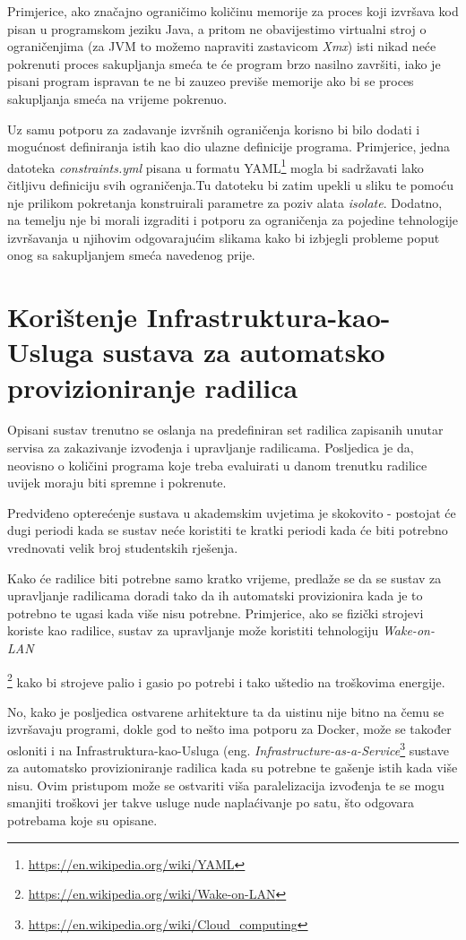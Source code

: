 \documentclass[times, utf8, zavrsni]{fer}
\begin{document}
{{Primjerice, ako značajno ograničimo količinu memorije za proces koji izvršava kod pisan u programskom jeziku Java, a pritom ne obavijestimo virtualni stroj o ograničenjima (za JVM to možemo napraviti zastavicom {\textit{Xmx}}) isti nikad neće pokrenuti proces sakupljanja smeća te će program brzo nasilno završiti, iako je pisani program ispravan te ne bi zauzeo previše memorije ako bi se proces sakupljanja smeća na vrijeme pokrenuo.

Uz samu potporu za zadavanje izvršnih ograničenja korisno bi bilo dodati i mogućnost definiranja istih kao dio ulazne definicije programa. Primjerice, jedna datoteka {\textit{constraints.yml}} pisana u formatu YAML\footnote{\url{https://en.wikipedia.org/wiki/YAML}} mogla bi sadržavati lako čitljivu definiciju svih ograničenja.Tu datoteku bi zatim upekli u sliku te pomoću nje prilikom pokretanja konstruirali parametre za poziv alata {\textit{isolate}}. Dodatno, na temelju nje bi morali izgraditi i potporu za ograničenja za pojedine tehnologije izvršavanja u njihovim odgovarajućim slikama kako bi izbjegli probleme poput onog sa sakupljanjem smeća navedenog prije.


\section{Korištenje Infrastruktura-kao-Usluga sustava za automatsko provizioniranje radilica}

Opisani sustav trenutno se oslanja na predefiniran set radilica zapisanih unutar servisa za zakazivanje izvođenja i upravljanje radilicama. Posljedica je da, neovisno o količini programa koje treba evaluirati u danom trenutku radilice uvijek moraju biti spremne i pokrenute.

Predviđeno opterećenje sustava u akademskim uvjetima je skokovito - postojat će dugi periodi kada se sustav neće koristiti te kratki periodi kada će biti potrebno vrednovati velik broj studentskih rješenja.

Kako će radilice biti potrebne samo kratko vrijeme, predlaže se da se sustav za upravljanje radilicama doradi tako da ih automatski provizionira kada je to potrebno te ugasi kada više nisu potrebne. Primjerice, ako se fizički strojevi koriste kao radilice, sustav za upravljanje može koristiti tehnologiju {\textit{Wake-on-LAN}}{\footnote{\url{https://en.wikipedia.org/wiki/Wake-on-LAN}} kako bi strojeve palio i gasio po potrebi i tako uštedio na troškovima energije.

No, kako je posljedica ostvarene arhitekture ta da uistinu nije bitno na čemu se izvršavaju programi, dokle god to nešto ima potporu za Docker, može se također osloniti i na Infrastruktura-kao-Usluga (eng. {\textit{Infrastructure-as-a-Service}}{\footnote{{\url{https://en.wikipedia.org/wiki/Cloud_computing}}}} sustave za automatsko provizioniranje radilica kada su potrebne te gašenje istih kada više nisu. Ovim pristupom može se ostvariti viša paralelizacija izvođenja te se mogu smanjiti troškovi jer takve usluge nude naplaćivanje po satu, što odgovara potrebama koje su opisane.

}}}
\end{document}
